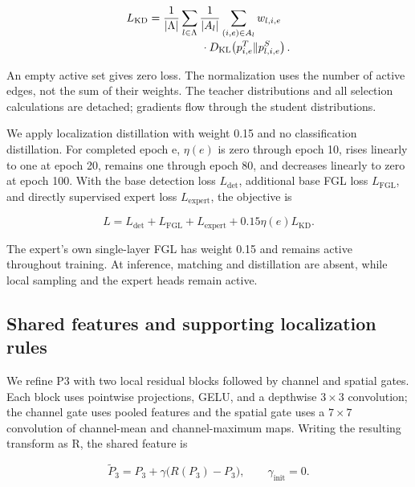 \begin{equation}\label{eq:kd}
\begin{aligned}
L_{\mathrm{KD}}={}&\frac{1}{|\Lambda|}\sum_{l\in\Lambda}\frac{1}{|A_l|}
\sum_{(i,e)\in A_l}w_{l,i,e}\\[-2pt]
&\hspace{12mm}\cdot D_{\mathrm{KL}}\!\left(p^T_{i,e}\Vert p^S_{l,i,e}\right).
\end{aligned}\end{equation}

An empty active set gives zero loss. The normalization uses the number of active edges, not the sum of their weights. The teacher distributions and all selection calculations are detached; gradients flow through the student distributions.


We apply localization distillation with weight 0.15 and no classification distillation. For completed epoch e, $\eta(e)$ is zero through epoch 10, rises linearly to one at epoch 20, remains one through epoch 80, and decreases linearly to zero at epoch 100. With the base detection loss $L_{\mathrm{det}}$, additional base FGL loss $L_{\mathrm{FGL}}$, and directly supervised expert loss $L_{\mathrm{expert}}$, the objective is


\begin{equation}\label{eq:5}
L=L_{\mathrm{det}}+L_{\mathrm{FGL}}+L_{\mathrm{expert}}+0.15\eta(e)L_{\mathrm{KD}}. 
\end{equation}

The expert's own single-layer FGL has weight 0.15 and remains active throughout training. At inference, matching and distillation are absent, while local sampling and the expert heads remain active.


\subsection{Shared features and supporting localization rules}

We refine P3 with two local residual blocks followed by channel and spatial gates. Each block uses pointwise projections, GELU, and a depthwise $3\times3$ convolution; the channel gate uses pooled features and the spatial gate uses a $7\times7$ convolution of channel-mean and channel-maximum maps. Writing the resulting transform as R, the shared feature is


\begin{equation}\label{eq:6}
\widetilde P_3=P_3+\gamma\bigl(R(P_3)-P_3\bigr),\qquad \gamma_{\mathrm{init}}=0. 
\end{equation}

